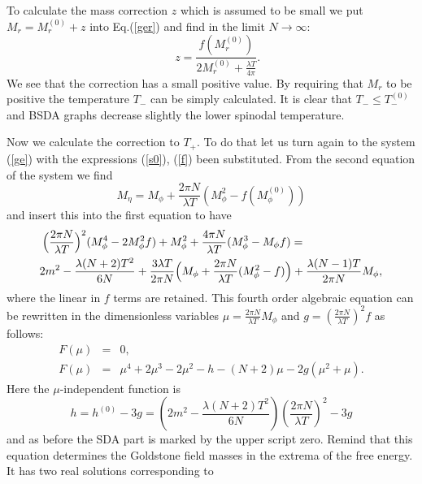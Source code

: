 \documentclass[a4paper,12pt]{article}
\begin{document}
To calculate the mass correction $z$ which is assumed to be small we
put $M_r = M^{(0)}_{r} + z $ into Eq.(\ref{ger}) and find in the limit
$N \to \infty$:
\begin{equation} \label{z}
~~~~~z = \frac{ f(M^{(0)}_{r})}{2 M^{(0)}_{r} + \frac{\lambda T}{ 4
      \pi} }.
\end{equation}
We see that the correction has a small positive value. By requiring
that $M_r$ to be positive the temperature $T_-$ can be simply
calculated. It is clear that $T_- \le T_-^{(0)}$ and BSDA graphs
decrease slightly the lower spinodal temperature.

Now we calculate the correction to $T_+$. To do that let us turn again
to the system (\ref{ge}) with the expressions (\ref{s0}), (\ref{f})
been substituted. From the second equation of the system we find
\begin{equation} \label{me}
M_{\eta} = M_{\phi} + \frac{2 \pi N}{\lambda T} (M_{\phi}^2 -
  f(M_{\phi}^{(0)}))
\end{equation}
and insert this into the first equation to have
\begin{eqnarray} \label{emf}
\Bigl(\frac{2\pi N}{\lambda T}\Bigr)^2 ( M_{\phi}^4 - 2 M_{\phi}^2 f )
+ M_{\phi}^2 + \frac{4\pi N}{\lambda T} (M_{\phi}^3 - M_{\phi} f )
=~~~~~~~~~~~~~~~~~~~~~ \\ \nonumber 2 m^2 - \frac{\lambda (N + 2)
T^2}{6 N} + \frac{3 \lambda T}{2 \pi N} \Bigl( M_{\phi} + \frac{2 \pi
N}{\lambda T} ( M_{\phi}^2 - f)\Bigr) + \frac{\lambda (N - 1) T}{2 \pi
N } M_{\phi},
\end{eqnarray}
where the linear in $f$ terms are retained. This fourth order
algebraic equation can be rewritten in the dimensionless variables
$\mu = \frac{2 \pi N}{\lambda T} M_{\phi}$ and $g = (\frac{2 \pi
N}{\lambda T})^2 f$ as follows:
\begin{eqnarray} \label{emf1}
F(\mu) &=& 0,~~~~~~~~~~~~~~~~~~~~~~~~~~~~~~~~~~~~~~~~~~~~~~~~~~~~~~\\
\nonumber F(\mu) &=& \mu^4 + 2\mu^3 - 2 \mu^2 - h - ( N + 2) \mu - 2 g
( \mu^2 + \mu ).
\end{eqnarray}
Here the $\mu$-independent function is
\begin{equation} \label{h}
h = h^{(0)} - 3 g = (2 m^2 - \frac{\lambda (N + 2) T^2}{6 N} )(\frac{2\pi
  N}{\lambda T})^2 - 3 g
\end{equation}
and as before the SDA part is marked by the upper script zero. Remind
that this equation determines the Goldstone field masses in the
extrema of the free energy. It has two real solutions corresponding to
\end{document}
